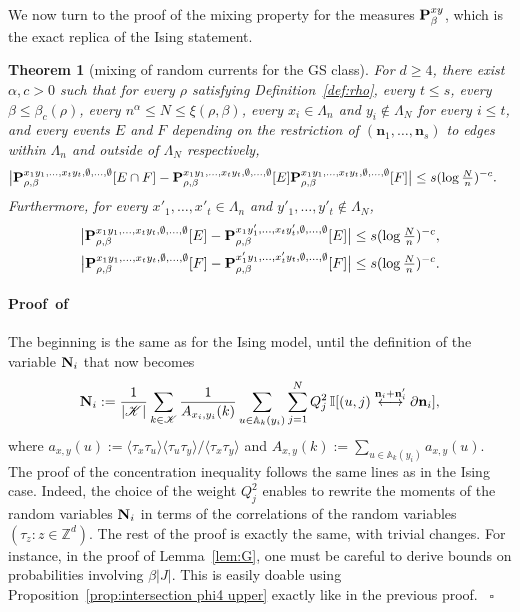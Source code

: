 \documentclass[a4paper,oneside,11pt]{article}
\def\Z{\mathbb{Z}}                          %
\newtheorem{theorem}{Theorem}[section]
\numberwithin{equation}{section}
\numberwithin{equation}{section}
\numberwithin{equation}{section}
\newenvironment{proof}[1][\relax]%
  {\paragraph{Proof\ifx#1\relax\else~of #1\fi}}%
  {~\hfill$\square$\par\bigskip}
\newcommand{\calK}{\mathcal{K}}
\newcommand{\bbA}{\mathbb{A}}
\def\Z{\mathbb{Z}}                          %
\newcommand{\n}{\mathbf{n}}
\begin{document}
We now turn to the proof of the mixing property for the measures ${\bf P}^{xy}_\beta$, which is the exact replica of the Ising statement.
\begin{theorem}[mixing of random currents for the GS class]\label{thm:mixing multi G-S}
For $d\ge4$, there exist $\alpha,c>0$ such that for every $\rho$ satisfying Definition~\ref{def:rho}, every $t\le s$, every $\beta\le \beta_c(\rho)$, every $n^\alpha\le N\le\xi(\rho,\beta)$, every $x_i\in\Lambda_n$ and $y_i\notin\Lambda_N$ for every $i\le t$, and every events $E$ and $F$ depending on the restriction of $(\n_1,\dots,\n_s)$ to edges within $\Lambda_n$ and outside of $\Lambda_N$ respectively,  
\begin{align}\label{eq:mixing GS}\big|{\bf P}^{x_1y_1,\dots,x_ty_t,\emptyset,\dots,\emptyset}_{\rho,\beta}[E\cap F]-{\bf P}^{x_1y_1,\dots,x_ty_t,\emptyset,\dots,\emptyset}_{\rho,\beta}[E]{\bf P}^{x_1y_1,\dots,x_ty_t,\emptyset,\dots,\emptyset}_{\rho,\beta}[F]\big|&\le s(\log \tfrac Nn)^{-c}.\end{align}
 Furthermore, for every $x'_1,\dots,x'_t\in\Lambda_n$ and $y'_1,\dots,y'_t\notin\Lambda_N$, 
\begin{align}\label{eq:independence GS}\big|{\bf P}^{x_1y_1,\dots,x_ty_t,\emptyset,\dots,\emptyset}_{\rho,\beta}[E]-{\bf P}^{x_1y_1',\dots,x_ty_t',\emptyset,\dots,\emptyset}_{\rho,\beta}[E]\big|&\le s(\log \tfrac Nn)^{-c},\\
\big|{\bf P}^{x_1y_1,\dots,x_ty_t,\emptyset,\dots,\emptyset}_{\rho,\beta}[F]-{\bf P}^{x_1'y_1,\dots,x_t'y_t,\emptyset,\dots,\emptyset}_{\rho,\beta}[F]\big|&\le s(\log \tfrac Nn)^{-c}.\end{align}
\end{theorem}

\begin{proof}
The beginning is the same as for the Ising model, until the definition of the variable ${\bf N}_i$ that now becomes
\begin{equation}{\bf N}_i:=\frac1{|\calK|}\sum_{k\in \calK}\frac{1}{A_{x_i,y_i}(k)}\sum_{u\in\bbA_k(y_i)}\sum_{j=1}^NQ_{j}^2\,\mathbb I[(u,j)\stackrel{\n_i+\n'_i}\longleftrightarrow \partial\n_i],
\end{equation}
where
$
a_{x,y}(u):=\langle\tau_x\tau_u\rangle\langle\tau_u\tau_y\rangle/\langle\tau_x\tau_y\rangle$ and $ A_{x,y}(k):=\sum_{u\in \bbA_k(y_i)}a_{x,y}(u)$.
The proof of the concentration inequality follows the same lines as in the Ising case. Indeed, the choice of the weight $Q_{j}^2$ enables to rewrite the moments of the random variables ${\bf N}_i$ in terms of the correlations of the random variables $(\tau_z:z\in \Z^d)$. 
The rest of the proof is exactly the same, with trivial changes. For instance, in the proof of Lemma~\ref{lem:G}, one must be careful to derive bounds on probabilities involving $\beta |J|$. This is easily doable  using Proposition~\ref{prop:intersection phi4 upper} exactly like in the previous proof. \end{proof}
\end{document}
